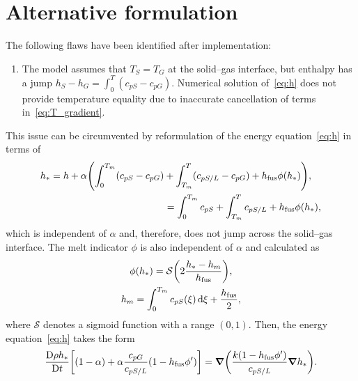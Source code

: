 \documentclass[final]{elsarticle} %
\newcommand\Dv[2][]{\frac{\mathrm{D}#1}{\mathrm{D}#2}}
\newcommand{\fusion}[1]{{#1}_\text{fus}}
\begin{document}
\section{Alternative formulation}

The following flaws have been identified after implementation:
\begin{enumerate}
    \item The model assumes that $T_S=T_G$ at the solid--gas interface,
    but enthalpy has a jump $h_S-h_G = \int_0^T (c_{pS}-c_{pG})$.
    Numerical solution of~\eqref{eq:h} does not provide temperature equality
    due to inaccurate cancellation of terms in~\eqref{eq:T_gradient}.
\end{enumerate}
This issue can be circumvented by reformulation of the energy equation~\eqref{eq:h} in terms of
\begin{equation}\label{eq:alt:h_star}
    \begin{multlined}
    h_* = h + \alpha\qty(\int_0^{T_m}(c_{pS}-c_{pG}) + \int_{T_m}^T (c_{pS/L}-c_{pG})
        + \fusion{h}\phi(h_*)), \\
    = \int_0^{T_m}c_{pS} + \int_{T_m}^T c_{pS/L} + \fusion{h}\phi(h_*),
    \end{multlined}
\end{equation}
which is independent of $\alpha$ and, therefore, does not jump across the solid--gas interface.
The melt indicator $\phi$ is also independent of $\alpha$ and calculated as
\begin{gather}
    \phi(h_*) = \mathcal{S}\qty(2\frac{h_*-h_m}{\fusion{h}}), \label{eq:alt:phi}\\
    h_m = \int_0^{T_m} c_{pS}(\xi)\dd{\xi} + \frac{\fusion{h}}2, \label{eq:h_m}
\end{gather}
where $\mathcal{S}$ denotes a sigmoid function with a range $(0,1)$.
Then, the energy equation~\eqref{eq:h} takes the form
\begin{equation}\label{eq:alt:h}
    \Dv[\rho h_*]{t}\qty[(1-\alpha) + \alpha\frac{c_{pG}}{c_{pS/L}}(1-\fusion{h}\phi') ]
        = \grad(\frac{k(1-\fusion{h}\phi')}{c_{pS/L}}\grad{h_*}).
\end{equation}



\end{document}
